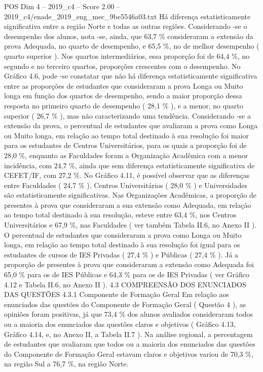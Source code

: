 \begin{textsample}{POS Dim 4 – 2019\_c4 – Score 2.00 – 2019\_c4/enade\_2019\_eng\_mec\_9be5546a03.txt}
Há diferença estatisticamente significativa entre a região Norte e todas as outras regiões.
Considerando -se o desempenho dos alunos, nota -se, ainda, que 63,7 \% consideraram a extensão da prova Adequada, no quarto de desempenho, e 65,5 \%, no de melhor desempenho ( quarto superior ).
Nos quartos intermediários, essa proporção foi de 64,4 \%, no segundo e no terceiro quartos, proporções crescentes com o desempenho.
No Gráfico 4.6, pode -se constatar que não há diferença estatisticamente significativa entre as proporções de estudantes que consideraram a prova Longa ou Muito longa em função dos quartos de desempenho, sendo a maior proporção dessa resposta no primeiro quarto de desempenho ( 28,1 \% ), e a menor, no quarto superior ( 26,7 \% ), mas não caracterizando uma tendência.
Considerando -se a extensão da prova, o percentual de estudantes que avaliaram a prova como Longa ou Muito longa, em relação ao tempo total destinado à sua resolução foi maior para os estudantes de Centros Universitários, para os quais a proporção foi de 28,0 \%, enquanto as Faculdades foram a Organização Acadêmica com a menor incidência, com 24,7 \%, ainda que sem diferença estatisticamente significativa de CEFET/IF, com 27,2 \%.
No Gráfico 4.11, é possível observar que as diferenças entre Faculdades ( 24,7 \% ), Centros Universitários ( 28,0 \% ) e Universidades são estatisticamente significativas.
Nas Organizações Acadêmicas, a proporção de presentes à prova que consideraram a sua extensão como Adequada, em relação ao tempo total destinado à sua resolução, esteve entre 63,4 \%, nos Centros Universitários e 67,9 \%, nas Faculdades ( ver também Tabela II.6, no Anexo II ).
O percentual de estudantes que consideraram a prova como Longa ou Muito longa, em relação ao tempo total destinado à sua resolução foi igual para os estudantes de cursos de IES Privadas ( 27,4 \% ) e Públicas ( 27,4 \% ).
Já a proporção de presentes à prova que consideraram a extensão como Adequada foi 65,0 \% para os de IES Públicas e 64,3 \% para os de IES Privadas ( ver Gráfico 4.12 e Tabela II.6, no Anexo II ). 4.3 COMPREENSÃO DOS ENUNCIADOS DAS QUESTÕES 4.3.1 Componente de Formação Geral Em relação aos enunciados das questões do Componente de Formação Geral ( Questão 4 ), as opiniões foram positivas, já que 73,4 \% dos alunos avaliados consideraram todos ou a maioria dos enunciados das questões claros e objetivos ( Gráfico 4.13, Gráfico 4.14, e, no Anexo II, a Tabela II.7 ).
Na análise regional, a percentagem de estudantes que avaliaram que todos ou a maioria dos enunciados das questões do Componente de Formação Geral estavam claros e objetivos variou de 70,3 \%, na região Sul a 76,7 \%, na região Norte.

\end{textsample}
